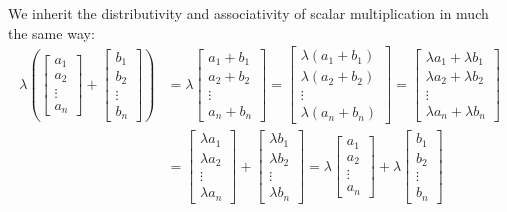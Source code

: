 \documentclass{article}
\begin{document}
We inherit the distributivity and associativity of scalar multiplication in much the same way:
\begin{align*}
    \lambda\left(\begin{bmatrix}
        a_1 \\
        a_2\\
        \vdots\\
        a_n
    \end{bmatrix}+\begin{bmatrix}
        b_1 \\
        b_2\\
        \vdots\\
        b_n
    \end{bmatrix}\right)&=\lambda\begin{bmatrix}
        a_1+b_1 \\
        a_2+b_2\\
        \vdots\\
        a_n+b_n
    \end{bmatrix}=\begin{bmatrix}
        \lambda(a_1+b_1)\\
        \lambda(a_2+b_2)\\
        \vdots\\
        \lambda(a_n+b_n)
    \end{bmatrix}=
    \begin{bmatrix}
        \lambda a_1+\lambda b_1\\
        \lambda a_2+\lambda b_2\\
        \vdots\\
        \lambda a_n+\lambda b_n
    \end{bmatrix}\\
    &=\begin{bmatrix}
        \lambda a_1 \\
        \lambda a_2\\
        \vdots\\
        \lambda a_n
    \end{bmatrix}+\begin{bmatrix}
        \lambda b_1 \\
        \lambda b_2\\
        \vdots\\
        \lambda b_n
    \end{bmatrix}=\lambda\begin{bmatrix}
        a_1 \\
        a_2\\
        \vdots\\
        a_n
    \end{bmatrix}+\lambda\begin{bmatrix}
        b_1 \\
        b_2\\
        \vdots\\
        b_n
    \end{bmatrix}\tag{VS7}
\end{align*}
\end{document}
